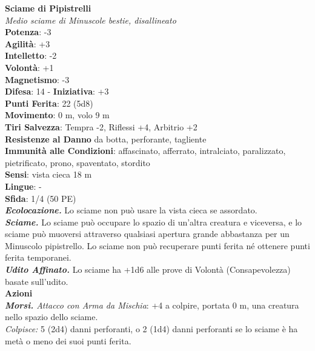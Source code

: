 \begin{multicols}{2}
\medskip\textbf{Sciame di Pipistrelli}\\
\emph{Medio sciame di Minuscole bestie, disallineato}\\
\textbf{Potenza}: -3\\
\textbf{Agilità}: +3\\
\textbf{Intelletto}: -2\\
\textbf{Volontà}: +1\\
\textbf{Magnetismo}: -3\\
\textbf{Difesa}: 14 - \textbf{Iniziativa}: +3\\
\textbf{Punti Ferita}: 22 (5d8)\\
\textbf{Movimento}: 0 m, volo 9 m\\
\textbf{Tiri Salvezza}: Tempra -2, Riflessi +4, Arbitrio +2\\
\textbf{Resistenze al Danno} da botta, perforante, tagliente\\
\textbf{Immunità alle Condizioni}: affascinato, afferrato, intralciato, paralizzato, pietrificato, prono, spaventato, stordito\\
\textbf{Sensi}: vista cieca 18 m\\
\textbf{Lingue}: -\\
\textbf{Sfida}: 1/4 (50 PE)\smallskip\\
\emph{\textbf{Ecolocazione.}} Lo sciame non può usare la vista cieca se assordato.\\
\emph{\textbf{Sciame.}} Lo sciame può occupare lo spazio di un'altra creatura e viceversa, e lo sciame può muoversi attraverso qualsiasi apertura grande abbastanza per un Minuscolo pipistrello. Lo sciame non può recuperare punti ferita né ottenere punti ferita temporanei.\\
\emph{\textbf{Udito Affinato.}} Lo sciame ha +1d6 alle prove di Volontà (Consapevolezza) basate sull'udito.\\
\smallskip\textbf{Azioni}\\
\emph{\textbf{Morsi.} Attacco con Arma da Mischia}: +4 a colpire, portata 0 m, una creatura nello spazio dello sciame.\\
\emph{Colpisce:} 5 (2d4) danni perforanti, o 2 (1d4) danni perforanti se lo sciame è ha metà o meno dei suoi punti ferita.\\


\end{multicols}
